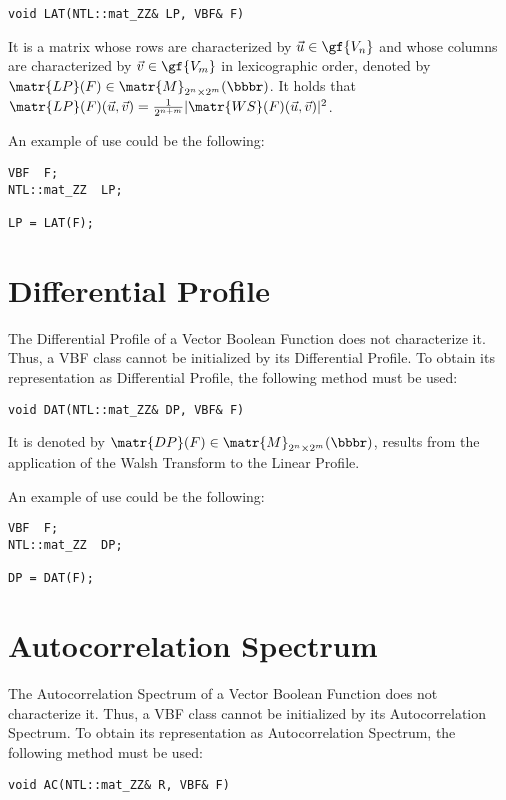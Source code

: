 \begin{verbatim}
void LAT(NTL::mat_ZZ& LP, VBF& F)
\end{verbatim}

It is a matrix whose rows are characterized by $\vec{u} \in \gf{V_n}$ and whose columns are characterized by $\vec{v} \in \gf{V_m}$ in lexicographic order, denoted by $\matr{LP}(F) \in \matr{M}_{2^n \times 2^m}(\bbbr)$. It holds that $\matr{LP}(F)(\vec{u},\vec{v}) =
  \frac{1}{2^{n+m}}|\matr{WS}(F)(\vec{u},\vec{v})|^2$. 

An example of use could be the following:
\begin{verbatim}
VBF  F;
NTL::mat_ZZ  LP;

LP = LAT(F);
\end{verbatim}

\section{Differential Profile}

The Differential Profile of a Vector Boolean Function does not characterize it. Thus, a VBF class cannot be initialized by its Differential Profile. To obtain its representation as Differential Profile, the following method must be used:

\begin{verbatim}
void DAT(NTL::mat_ZZ& DP, VBF& F)
\end{verbatim}

It is denoted by $\matr{DP}(F) \in \matr{M}_{2^n \times 2^m}(\bbbr)$, results from the application of the Walsh Transform to the Linear Profile. 

An example of use could be the following:
\begin{verbatim}
VBF  F;
NTL::mat_ZZ  DP;

DP = DAT(F);
\end{verbatim}

\section{Autocorrelation Spectrum}

The Autocorrelation Spectrum of a Vector Boolean Function does not characterize it. Thus, a VBF class cannot be initialized by its Autocorrelation Spectrum. To obtain its representation as Autocorrelation Spectrum, the following method must be used:

\begin{verbatim}
void AC(NTL::mat_ZZ& R, VBF& F)
\end{verbatim}

